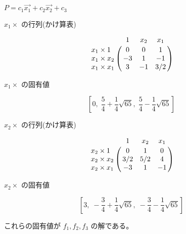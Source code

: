 \documentclass[dvipdfmx,11pt,notheorems]{beamer}
\theoremstyle{definition}
\begin{document}
\begin{frame}
$P=c_1\vec{x_1} + c_2\vec{x_2} + c_3$ 

\begin{block}{$x_1 \times $ の行列(かけ算表)}

\[
\bordermatrix{
 &  1 & x_2 & x_1\cr
 x_1\times 1   &  0 &  0 &  1 \cr
 x_1\times x_2 & -3 &  1 & -1 \cr
 x_1\times x_1 &  3 & -1 & 3/2 \cr
}
\]
\end{block}

\begin{block}{$x_1 \times$ の固有値}

\[ \left[ 0, \; \frac{5}{4}+\frac{1}{4}\sqrt{65},
\; \frac{5}{4}-\frac{1}{4}\sqrt{65}\right] \]

\end{block}

\end{frame}

\begin{frame}
\begin{block}{$x_2 \times $ の行列(かけ算表)}

\[
\bordermatrix{
 &  1 & x_2 & x_1\cr
 x_2\times 1   &  0  &  1  &  0 \cr
 x_2\times x_2 & 3/2 & 5/2 &  4 \cr
 x_2\times x_1 & -3  &  1  & -1 \cr
}
\]
\end{block}
\begin{block}{$x_2 \times$ の固有値}

\[ \left[ 3, \; -\frac{3}{4}+\frac{1}{4}\sqrt{65},
\; -\frac{3}{4}-\frac{1}{4}\sqrt{65}\right] \]


\end{block}

これらの固有値が $f_1,f_2,f_3$ の解である。
\end{frame}
\end{document}
